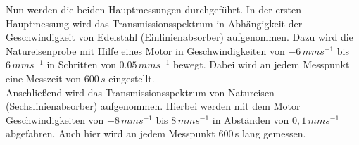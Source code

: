 	Nun werden die beiden Hauptmessungen durchgeführt. In der ersten Hauptmessung wird das Transmissionsspektrum in Abhängigkeit der Geschwindigkeit von Edelstahl (Einlinienabsorber) aufgenommen. Dazu wird die Natureisenprobe mit Hilfe eines Motor in Geschwindigkeiten von $-6\,\si{mms^{-1}}$ bis $6\,\si{mms^{-1}}$ in Schritten von $0.05\,\si{mms^{-1}}$ bewegt. Dabei wird an jedem Messpunkt eine Messzeit von $600\,\si{s}$ eingestellt.\\
	
	Anschließend wird das Transmissionsspektrum von Natureisen (Sechslinienabsorber) aufgenommen. Hierbei werden mit dem Motor Geschwindigkeiten von $-8\,\si{mms^{-1}}$ bis $8\,\si{mms^{-1}}$ in Abständen von $0,1\,\si{mms^{-1}}$ abgefahren. Auch hier wird an jedem Messpunkt 600\,\si{s} lang gemessen.
	
%		
%		
%		
%		
	
		
